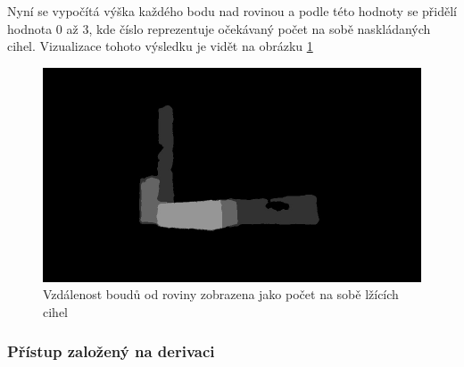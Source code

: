 \documentclass[twoside]{ctuthesis}
\begin{document}
Nyní se vypočítá výška každého bodu nad rovinou a podle této hodnoty se přidělí hodnota 0 až 3, kde číslo reprezentuje očekávaný počet na sobě naskládaných cihel. Vizualizace tohoto výsledku je vidět na obrázku \ref{fig:height_map}

\begin{figure}
    \centering
    \includegraphics[width = \linewidth]{pictures/original_vrstva2_pic1.jpg}
    \caption{Vzdálenost boudů od roviny zobrazena jako počet na sobě lžících cihel}
    \label{fig:height_map}
\end{figure}

\subsubsection{Přístup založený na derivaci}





\end{document}
